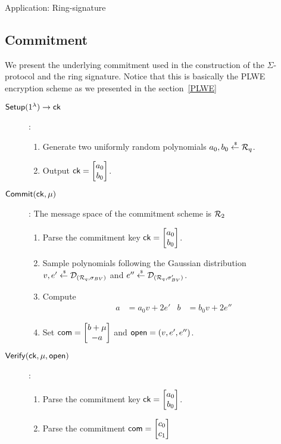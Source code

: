 \begin{section}{Application: Ring-signature}
  \subsection{Commitment}
  We present the underlying commitment used in the construction of the $\Sigma$-protocol
  and the ring signature.
  Notice that this is basically the PLWE encryption scheme as we presented in the section~\ref{PLWE}
  \begin{description}
    \item [${\mathsf{Setup}}(1^\lambda) \to \mathsf{ck}$]:
    \begin{enumerate}
      \item Generate two uniformly random polynomials $a_0, b_0 \stackrel{{\scriptscriptstyle \mkern4mu \$}}{\gets} {\mathcal{R}}_q$.
      \item Output $\mathsf{ck} = \begin{bmatrix} a_0 \\ b_0 \end{bmatrix}$.
    \end{enumerate}
    \item [${\mathsf{Commit}}(\mathsf{ck}, \mu)$]: The message space of the commitment scheme is ${\mathcal{R}}_2$
    \begin{enumerate}
      \item Parse the commitment key $\mathsf{ck} = \begin{bmatrix} a_0 \\ b_0 \end{bmatrix}$.
      \item Sample polynomials following the Gaussian distribution
      $v,e' \stackrel{{\scriptscriptstyle \mkern4mu \$}}{\gets} \mathcal{D}_{({\mathcal{R}}_q, \sigma_{BV})}$ and $e'' \stackrel{{\scriptscriptstyle \mkern4mu \$}}{\gets} \mathcal{D}_{({\mathcal{R}}_q, \sigma'_{BV})}$.
      \item Compute
      \begin{align*}
        a &= a_0 v + 2e' & b &= b_0v +2 e''
      \end{align*}
      \item Set $\mathsf{com} = \begin{bmatrix}  b+ \mu \\  -a \end{bmatrix}$ and $\mathsf{open} = (v, e', e'')$.
    \end{enumerate}
    \item [${\mathsf{Verify}}(\mathsf{ck}, \mu, \mathsf{open})$]:
    \begin{enumerate}
      \item Parse the commitment key $\mathsf{ck} = \begin{bmatrix} a_0 \\ b_0 \end{bmatrix}$.
      \item Parse the commitment $\mathsf{com} = \begin{bmatrix} c_0 \\ c_1 \end{bmatrix}$

\end{enumerate}
\end{description}
\end{section}
